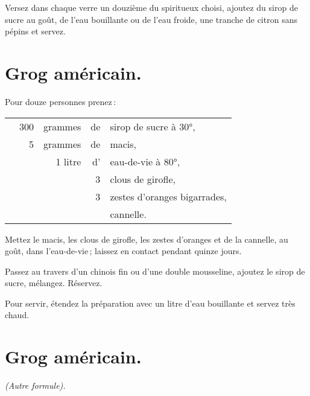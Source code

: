 Versez dans chaque verre un douzième du spiritueux choisi, ajoutez du sirop de
sucre au goût, de l'eau bouillante ou de l’eau froide, une tranche de citron
sans pépins et servez.

\section*{\centering Grog américain.}
{}

Pour douze personnes prenez :

\footnotesize
\begin{longtable}{rrrrp{16em}}
  & 300 & grammes & de & sirop de sucre à 30°,                                                            \\
  &   5 & grammes & de & macis,                                                                           \\
  & \multicolumn{2}{r}{1 litre} & d' & eau-de-vie à 80°,                                                  \\
  &     &         &  3 & clous de girofle,                                                                \\
  &     &         &  3 & zestes d'oranges bigarrades,                                                     \\
  &     &         &    & cannelle.                                                                        \\
\end{longtable}
\normalsize


Mettez le macis, les clous de girofle, les zestes d'oranges et de la cannelle,
au goût, dans l'eau-de-vie ; laissez en contact pendant quinze jours.

Passez au travers d'un chinois fin ou d'une double mousseline, ajoutez le sirop
de sucre, mélangez. Réservez.

Pour servir, étendez la préparation avec un litre d’eau bouillante et servez
très chaud.

\section*{\centering Grog américain.}
{}

\begin{center}
\textit{(Autre formule).}
\end{center}

